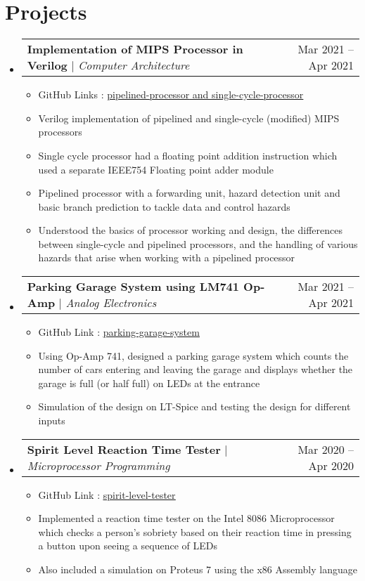\documentclass[a4paper,11pt]{article}
\makeatletter
\newcommand{\resumeItem}[1]{
  \item\small{
    {#1 \vspace{-2pt}}
  }
}
\newcommand{\resumeProjectHeading}[2]{
    \item
    \begin{tabular*}{0.97\textwidth}{l@{\extracolsep{\fill}}r}
      \small#1 & #2 \\
    \end{tabular*}\vspace{-7pt}
}
\newcommand{\resumeSubHeadingListStart}{\begin{itemize}[leftmargin=0.15in, label={}]}
\newcommand{\resumeSubHeadingListEnd}{\end{itemize}}
\newcommand{\resumeItemListStart}{\begin{itemize}}
\newcommand{\resumeItemListEnd}{\end{itemize}\vspace{-5pt}}
\makeatother
\begin{document}
\section{Projects}
    \resumeSubHeadingListStart
      \resumeProjectHeading
          {\textbf{Implementation of MIPS Processor in Verilog} $|$ \emph{Computer Architecture}}{Mar 2021 -- Apr 2021}
          \resumeItemListStart
            \resumeItem{GitHub Links : \href{https://github.com/manig1729/mips-pipelined-processor}{\underline{pipelined-processor} and \href{https://github.com/manig1729/mips-single-cycle-processor}{\underline{single-cycle-processor}}}}
            \resumeItem{Verilog implementation of pipelined and single-cycle (modified) MIPS processors}
            \resumeItem{Single cycle processor had a floating point addition instruction which used a separate IEEE754 Floating point adder module}
            \resumeItem{Pipelined processor with a forwarding unit, hazard detection unit and basic branch prediction to tackle data and control hazards}
            \resumeItem{Understood the basics of processor working and design, the differences between single-cycle and pipelined processors, and the
handling of various hazards that arise when working with a pipelined processor}
          \resumeItemListEnd
      \resumeProjectHeading
          {\textbf{Parking Garage System using LM741 Op-Amp} $|$ \emph{Analog Electronics}}{Mar 2021 -- Apr 2021}
          \resumeItemListStart
            \resumeItem{GitHub Link : \href{https://github.com/manig1729/parking-garage-system}{\underline{parking-garage-system}}}
            \resumeItem{Using Op-Amp 741, designed a parking garage system which counts the number of cars entering and leaving the garage and displays whether the garage is full (or half full) on LEDs at the entrance}
            \resumeItem{Simulation of the design on LT-Spice and testing the design for different inputs}
          \resumeItemListEnd
          
      \resumeProjectHeading
          {\textbf{Spirit Level Reaction Time Tester} $|$ \emph{Microprocessor Programming}}{Mar 2020 -- Apr 2020}
          \resumeItemListStart
            \resumeItem{GitHub Link : \href{https://github.com/manig1729/spirit-level-tester}{\underline{spirit-level-tester}}}
            \resumeItem{Implemented a reaction time tester on the Intel 8086 Microprocessor which checks a person's sobriety based on their reaction time in pressing a button upon seeing a sequence of LEDs}
            \resumeItem{Also included a simulation on Proteus 7 using the x86 Assembly language}
          \resumeItemListEnd
    \resumeSubHeadingListEnd
\end{document}
